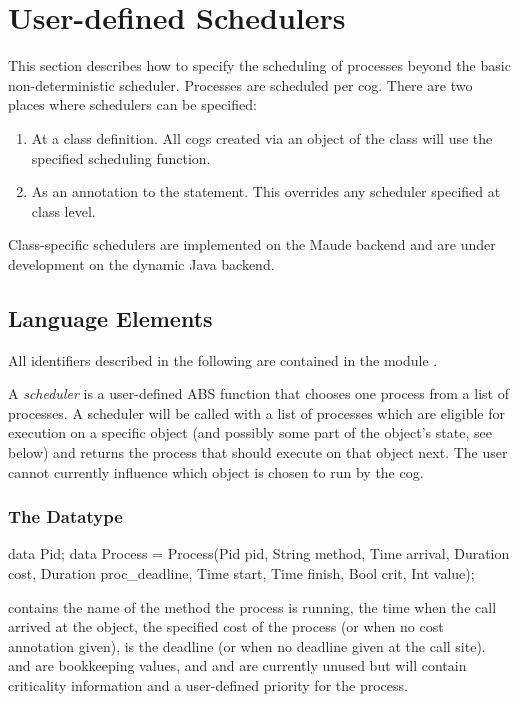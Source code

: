  \chapter{User-defined Schedulers}\label{ch:schedulers}
  This section describes how to specify the scheduling of processes
  beyond the basic non-deterministic scheduler.  Processes are scheduled
  per cog.  There are two places where schedulers can be specified:
\begin{enumerate}
\item At a class definition.  All cogs created via an object of the
  class will use the specified scheduling function.
\item As an annotation to the  statement.  This overrides
  any scheduler specified at class level.
\end{enumerate}
  Class-specific schedulers are implemented on the Maude backend and are
  under development on the dynamic Java backend.

\section{Language Elements}

  All identifiers described in the following are contained in the module
  .

  A \emph{scheduler} is a user-defined ABS function that chooses one process
  from a list of processes.  A scheduler will be called with a list of
  processes which are eligible for execution on a specific object (and
  possibly some part of the object's state, see below) and returns the
  process that should execute on that object next.  The user cannot
  currently influence which object is chosen to run by the cog.

\subsection{The  Datatype}

\begin{absexample} 
data Pid;
data Process = Process(Pid pid, String method, Time arrival,
    Duration cost, Duration proc_deadline, Time start, Time finish, 
    Bool crit, Int value);
\end{absexample} 

    contains the name of the method the process is running,
    the time when the call arrived at the object,
    the specified cost of the process (or  when no cost
   annotation given),  is the deadline (or
    when no deadline given at the call site).
    and  are bookkeeping values, and 
   and  are currently unused but will contain criticality
   information and a user-defined priority for the process.

